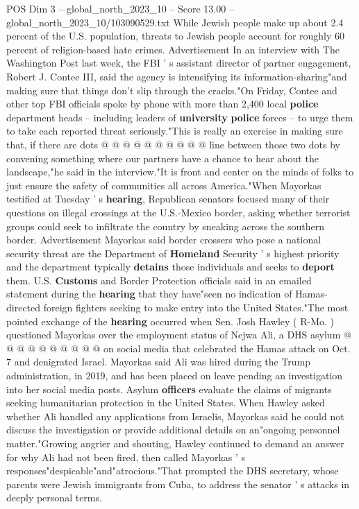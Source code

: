 \begin{textsample}{POS Dim 3 – global\_north\_2023\_10 – Score 13.00 – global\_north\_2023\_10/103090529.txt}
While Jewish people make up about 2.4 percent of the U.S. population, threats to Jewish people account for roughly 60 percent of religion-based hate crimes.
Advertisement In an interview with The Washington Post last week, the FBI ' s assistant director of partner engagement, Robert J.
Contee III, said the agency is intensifying its information-sharing"and making sure that things don't slip through the cracks."On Friday, Contee and other top FBI officials spoke by phone with more than 2,400 local \textbf{police} department heads -- including leaders of \textbf{university} \textbf{police} forces -- to urge them to take each reported threat seriously."This is really an exercise in making sure that, if there are dots @ @ @ @ @ @ @ @ @ @ line between those two dots by convening something where our partners have a chance to hear about the landscape,"he said in the interview."It is front and center on the minds of folks to just ensure the safety of communities all across America."When Mayorkas testified at Tuesday ' s \textbf{hearing}, Republican senators focused many of their questions on illegal crossings at the U.S.-Mexico border, asking whether terrorist groups could seek to infiltrate the country by sneaking across the southern border.
Advertisement Mayorkas said border crossers who pose a national security threat are the Department of \textbf{Homeland} Security ' s highest priority and the department typically \textbf{detains} those individuals and seeks to \textbf{deport} them.
U.S. \textbf{Customs} and Border Protection officials said in an emailed statement during the \textbf{hearing} that they have"seen no indication of Hamas-directed foreign fighters seeking to make entry into the United States."The most pointed exchange of the \textbf{hearing} occurred when Sen.
Josh Hawley ( R-Mo. ) questioned Mayorkas over the employment status of Nejwa Ali, a DHS asylum @ @ @ @ @ @ @ @ @ @ on social media that celebrated the Hamas attack on Oct. 7 and denigrated Israel.
Mayorkas said Ali was hired during the Trump administration, in 2019, and has been placed on leave pending an investigation into her social media posts.
Asylum \textbf{officers} evaluate the claims of migrants seeking humanitarian protection in the United States.
When Hawley asked whether Ali handled any applications from Israelis, Mayorkas said he could not discuss the investigation or provide additional details on an"ongoing personnel matter."Growing angrier and shouting, Hawley continued to demand an answer for why Ali had not been fired, then called Mayorkas ' s responses"despicable"and"atrocious."That prompted the DHS secretary, whose parents were Jewish immigrants from Cuba, to address the senator ' s attacks in deeply personal terms.

\end{textsample}
